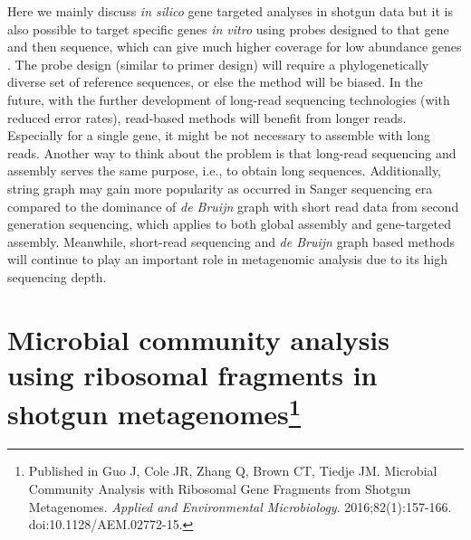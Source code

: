 \documentclass[]{msu-thesis}
\begin{document}
Here we mainly discuss \textit{in silico} gene targeted analyses in
shotgun data but it is also possible to target specific genes \textit{in
vitro} using probes designed to that gene and then sequence, which can give
much higher coverage for low abundance genes
\cite{mercer_targeted_2014}. The probe design (similar to primer design)
will require a phylogenetically diverse set of reference sequences, or
else the method will be biased. In the future, with the further development
of long-read sequencing technologies (with reduced error rates), read-based
methods will benefit from longer reads. Especially for a single gene, it
might be not necessary to assemble with long reads. Another way to think
about the problem is that long-read sequencing and assembly serves the
same purpose, i.e., to obtain long sequences. Additionally, string graph may gain more
popularity as occurred in Sanger sequencing era compared to the dominance of
\textit{de Bruijn} graph with short read data from second generation
sequencing, which applies to both global assembly and gene-targeted
assembly. Meanwhile, short-read sequencing and \textit{de Bruijn} graph
based methods will continue to play an important role in metagenomic
analysis due to its high sequencing depth.





\chapter[Microbial community analysis using ribosomal fragments in shotgun metagenomes]{Microbial community analysis using ribosomal fragments in shotgun metagenomes\protect\footnote{P\MakeLowercase{ublished in} G\MakeLowercase{uo} J, C\MakeLowercase{ole} JR, Z\MakeLowercase{hang} Q, B\MakeLowercase{rown} CT, T\MakeLowercase{iedje} JM. M\MakeLowercase{icrobial} C\MakeLowercase{ommunity} A\MakeLowercase{nalysis with} R\MakeLowercase{ibosomal} G\MakeLowercase{ene} F\MakeLowercase{ragments from} S\MakeLowercase{hotgun} M\MakeLowercase{etagenomes}. \textit{A\MakeLowercase{pplied and} E\MakeLowercase{nvironmental} M\MakeLowercase{icrobiology}}. 2016;82(1):157-166. \MakeLowercase{doi}:10.1128/AEM.02772-15.}}

%
\end{document}
